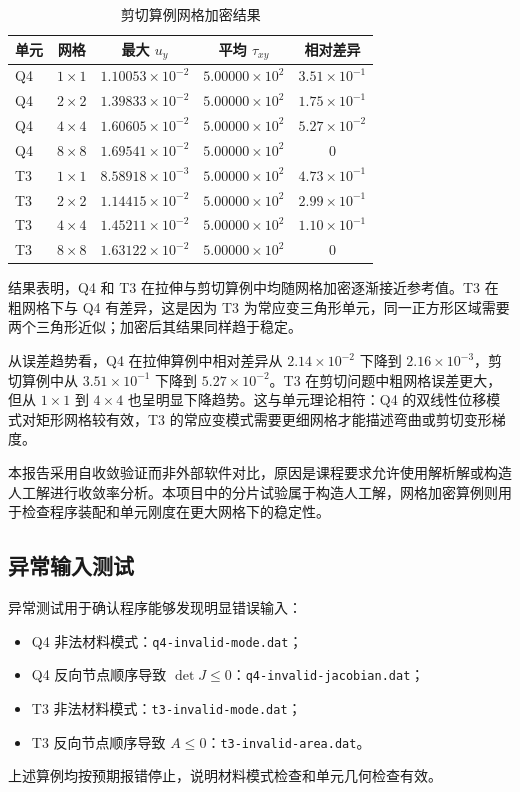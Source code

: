 ﻿\documentclass[UTF8,11pt,a4paper]{ctexart}
\begin{document}
\begin{table}[H]
\centering
\caption{剪切算例网格加密结果}
\small
\begin{tabular}{lcccc}
\toprule
单元 & 网格 & 最大 $u_y$ & 平均 $\tau_{xy}$ & 相对差异 \\
\midrule
Q4 & $1\times1$ & $1.10053\times10^{-2}$ & $5.00000\times10^2$ & $3.51\times10^{-1}$ \\
Q4 & $2\times2$ & $1.39833\times10^{-2}$ & $5.00000\times10^2$ & $1.75\times10^{-1}$ \\
Q4 & $4\times4$ & $1.60605\times10^{-2}$ & $5.00000\times10^2$ & $5.27\times10^{-2}$ \\
Q4 & $8\times8$ & $1.69541\times10^{-2}$ & $5.00000\times10^2$ & $0$ \\
T3 & $1\times1$ & $8.58918\times10^{-3}$ & $5.00000\times10^2$ & $4.73\times10^{-1}$ \\
T3 & $2\times2$ & $1.14415\times10^{-2}$ & $5.00000\times10^2$ & $2.99\times10^{-1}$ \\
T3 & $4\times4$ & $1.45211\times10^{-2}$ & $5.00000\times10^2$ & $1.10\times10^{-1}$ \\
T3 & $8\times8$ & $1.63122\times10^{-2}$ & $5.00000\times10^2$ & $0$ \\
\bottomrule
\end{tabular}
\end{table}

结果表明，Q4 和 T3 在拉伸与剪切算例中均随网格加密逐渐接近参考值。T3 在粗网格下与 Q4 有差异，这是因为 T3 为常应变三角形单元，同一正方形区域需要两个三角形近似；加密后其结果同样趋于稳定。

从误差趋势看，Q4 在拉伸算例中相对差异从 $2.14\times10^{-2}$ 下降到 $2.16\times10^{-3}$，剪切算例中从 $3.51\times10^{-1}$ 下降到 $5.27\times10^{-2}$。T3 在剪切问题中粗网格误差更大，但从 $1\times1$ 到 $4\times4$ 也呈明显下降趋势。这与单元理论相符：Q4 的双线性位移模式对矩形网格较有效，T3 的常应变模式需要更细网格才能描述弯曲或剪切变形梯度。

本报告采用自收敛验证而非外部软件对比，原因是课程要求允许使用解析解或构造人工解进行收敛率分析。本项目中的分片试验属于构造人工解，网格加密算例则用于检查程序装配和单元刚度在更大网格下的稳定性。

\subsection{异常输入测试}
异常测试用于确认程序能够发现明显错误输入：
\begin{itemize}
  \item Q4 非法材料模式：\texttt{q4-invalid-mode.dat}；
  \item Q4 反向节点顺序导致 $\det J\le0$：\texttt{q4-invalid-jacobian.dat}；
  \item T3 非法材料模式：\texttt{t3-invalid-mode.dat}；
  \item T3 反向节点顺序导致 $A\le0$：\texttt{t3-invalid-area.dat}。
\end{itemize}
上述算例均按预期报错停止，说明材料模式检查和单元几何检查有效。
\end{document}

